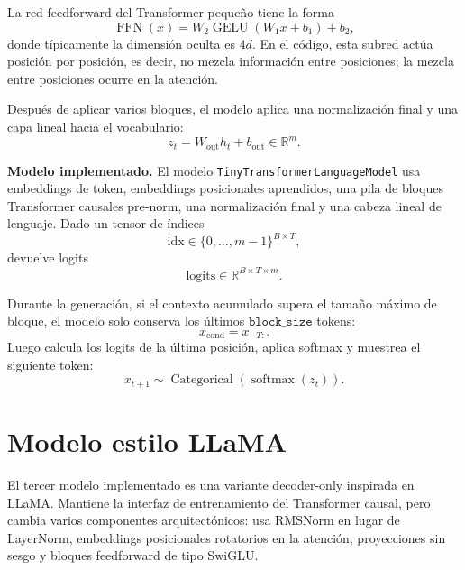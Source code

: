 \documentclass[11pt]{report}
\newenvironment{tcolorbox}[1][]{\par\medskip\noindent\ignorespaces}{\par\medskip}
\theoremstyle{definition}
\theoremstyle{plain}
\numberwithin{equation}{section}
\begin{document}
La red feedforward del Transformer pequeño tiene la forma
\begin{equation*}
    \operatorname{FFN}(x)
    =
    W_2\operatorname{GELU}(W_1x+b_1)+b_2,
\end{equation*}
donde típicamente la dimensión oculta es \(4d\). En el código, esta subred actúa posición por posición, es decir, no mezcla información entre posiciones; la mezcla entre posiciones ocurre en la atención.

Después de aplicar varios bloques, el modelo aplica una normalización final y una capa lineal hacia el vocabulario:
\begin{equation*}
    z_t
    =
    W_{\mathrm{out}}h_t+b_{\mathrm{out}}
    \in\mathbb{R}^m.
\end{equation*}

\begin{tcolorbox}[colback=blue!8, colframe=blue!8, boxrule=0pt]
\textbf{Modelo implementado.} El modelo \texttt{TinyTransformerLanguageModel} usa embeddings de token, embeddings posicionales aprendidos, una pila de bloques Transformer causales pre-norm, una normalización final y una cabeza lineal de lenguaje. Dado un tensor de índices
\begin{equation*}
    \mathrm{idx}\in\{0,\ldots,m-1\}^{B\times T},
\end{equation*}
devuelve logits
\begin{equation*}
    \mathrm{logits}\in\mathbb{R}^{B\times T\times m}.
\end{equation*}
\end{tcolorbox}

Durante la generación, si el contexto acumulado supera el tamaño máximo de bloque, el modelo solo conserva los últimos \(\texttt{block\_size}\) tokens:
\begin{equation*}
    x_{\mathrm{cond}}
    =
    x_{-T:}.
\end{equation*}
Luego calcula los logits de la última posición, aplica softmax y muestrea el siguiente token:
\begin{equation*}
    x_{t+1}
    \sim
    \operatorname{Categorical}
    \left(
        \operatorname{softmax}(z_t)
    \right).
\end{equation*}

\section{Modelo estilo LLaMA}

El tercer modelo implementado es una variante decoder-only inspirada en LLaMA. Mantiene la interfaz de entrenamiento del Transformer causal, pero cambia varios componentes arquitectónicos: usa RMSNorm en lugar de LayerNorm, embeddings posicionales rotatorios en la atención, proyecciones sin sesgo y bloques feedforward de tipo SwiGLU.
\end{document}
